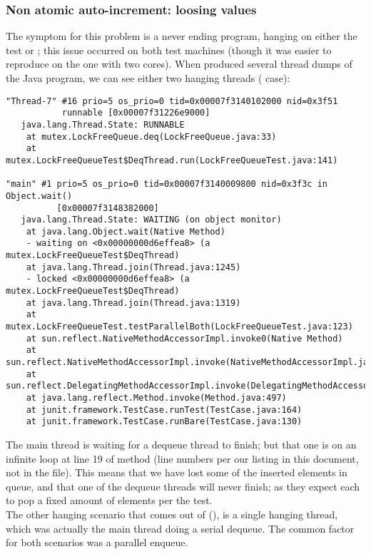 \subsubsection{Non atomic auto-increment: loosing values}

The symptom for this problem is a never ending program, hanging on
either the test  or ; this
issue occurred on both test machines (though it was easier to
reproduce on the one with two cores). When produced several thread
dumps of the Java program, we can see either two hanging threads
( case): \\

\begin{verbatim}
"Thread-7" #16 prio=5 os_prio=0 tid=0x00007f3140102000 nid=0x3f51
           runnable [0x00007f31226e9000]
   java.lang.Thread.State: RUNNABLE
	at mutex.LockFreeQueue.deq(LockFreeQueue.java:33)
	at mutex.LockFreeQueueTest$DeqThread.run(LockFreeQueueTest.java:141)

"main" #1 prio=5 os_prio=0 tid=0x00007f3140009800 nid=0x3f3c in Object.wait() 
          [0x00007f3148382000]
   java.lang.Thread.State: WAITING (on object monitor)
	at java.lang.Object.wait(Native Method)
	- waiting on <0x00000000d6effea8> (a mutex.LockFreeQueueTest$DeqThread)
	at java.lang.Thread.join(Thread.java:1245)
	- locked <0x00000000d6effea8> (a mutex.LockFreeQueueTest$DeqThread)
	at java.lang.Thread.join(Thread.java:1319)
	at mutex.LockFreeQueueTest.testParallelBoth(LockFreeQueueTest.java:123)
	at sun.reflect.NativeMethodAccessorImpl.invoke0(Native Method)
	at sun.reflect.NativeMethodAccessorImpl.invoke(NativeMethodAccessorImpl.java:62)
	at sun.reflect.DelegatingMethodAccessorImpl.invoke(DelegatingMethodAccessorImpl.java:43)
	at java.lang.reflect.Method.invoke(Method.java:497)
	at junit.framework.TestCase.runTest(TestCase.java:164)
	at junit.framework.TestCase.runBare(TestCase.java:130)
\end{verbatim}
\hfill

The main thread is waiting for a dequeue thread to finish; but that
one is on an infinite loop at line 19 of  method (line numbers
per our listing in this document, not in the file). This means that we
have lost some of the inserted elements in queue, and that one of the
dequeue threads will never finish; as they expect each to pop a fixed
amount of elements per the test. \\

The other hanging scenario that comes out of (), is
a single hanging thread, which was actually the main thread doing a 
serial dequeue. The common factor for both scenarios was a parallel
enqueue. \\ 

